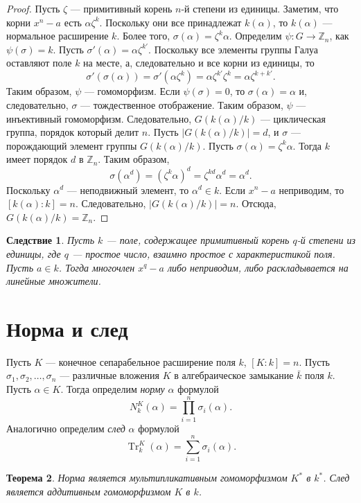 \documentclass[12pt, titlepage, oneside]{amsbook}
\newcommand{\Tr}{\operatorname{Tr}}
\newcommand{\ZZ}{\mathbb{Z}}
\newtheorem{theorem}{Теорема}[chapter]
\newtheorem{corollary}[theorem]{Следствие}
\theoremstyle{definition}
\theoremstyle{remark}
\begin{document}
\begin{proof}
Пусть $\zeta$ --- примитивный корень $n$-й степени из единицы. Заметим, что корни $x^n-a$ есть $\alpha\zeta^k$. Поскольку они все принадлежат $k(\alpha)$, то $k(\alpha)$ --- нормальное расширение $k$. Более того, $\sigma(\alpha)=\zeta^k\alpha$. Определим $\psi\colon G\rightarrow \ZZ_n$, как $\psi(\sigma)=k$. Пусть $\sigma'(\alpha)=\alpha\zeta^{k'}$. Поскольку все элементы группы Галуа оставляют поле $k$ на месте, а, следовательно и все корни из единицы, то $$\sigma'(\sigma(\alpha))=\sigma'(\alpha\zeta^k)=\alpha\zeta^{k'}\zeta^k=\alpha\zeta^{k+k'}.$$ Таким образом, $\psi$ --- гомоморфизм.
Если $\psi(\sigma)=0$, то $\sigma(\alpha)=\alpha$ и, следовательно, $\sigma$ --- тождественное отображение. Таким образом, $\psi$ --- инъективный гомоморфизм. Следовательно, $G(k(\alpha)/k)$ --- циклическая группа, порядок который делит $n$. Пусть $|G(k(\alpha)/k)|=d$, и $\sigma$ --- порождающий элемент группы $G(k(\alpha)/k)$. Пусть $\sigma(\alpha)=\zeta^k\alpha$. Тогда $k$ имеет порядок $d$ в $\ZZ_n$. Таким образом, $$\sigma(\alpha^d)=(\zeta^k\alpha)^d=\zeta^{kd}\alpha^d=\alpha^d.$$ Поскольку $\alpha^d$ --- неподвижный элемент, то $\alpha^d\in k$. Если $x^n-a$ неприводим, то $[k(\alpha):k]=n$. Следовательно, $|G(k(\alpha)/k)|=n$. Отсюда, $G(k(\alpha)/k)=\ZZ_n$.
\end{proof}

\begin{corollary}
\label{Edin4}
Пусть $k$ --- поле, содержащее примитивный корень $q$-й степени из единицы, где $q$ --- простое число, взаимно простое с характеристикой поля. Пусть $a\in k$. Тогда многочлен $x^q-a$ либо неприводим, либо раскладывается на линейные множители.
\end{corollary}

\section{Норма и след}

Пусть $K$ --- конечное сепарабельное расширение поля $k$, $[K:k]=n$. Пусть $\sigma_1,\sigma_2,\ldots,\sigma_n$ --- различные вложения $K$ в алгебраическое замыкание $\bar{k}$ поля $k$. Пусть $\alpha\in K$. Тогда определим \emph{норму} $\alpha$ формулой $$N_k^K(\alpha)=\prod\limits_{i=1}^n \sigma_i(\alpha).$$ Аналогично определим \emph{след} $\alpha$ формулой $$\Tr_k^K(\alpha)=\sum\limits_{i=1}^n \sigma_i(\alpha).$$

\begin{theorem}
\label{Norm1}
Норма является мультипликативным гомоморфизмом $K^*$ в $k^*$. След является аддитивным гомоморфизмом $K$ в $k$.
\end{theorem}
\end{document}
